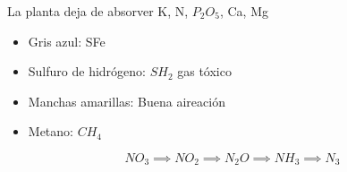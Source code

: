 La planta deja de absorver K, N, $P_2O_5$, Ca, Mg

\begin{itemize}
    \item Gris azul: SFe
    \item Sulfuro de hidrógeno: $SH_2$ gas tóxico
    \item Manchas amarillas: Buena aireación
    \item Metano: $CH_4$
\end{itemize}
\begin{equation}
    NO_3\implies NO_2\implies N_2O\implies NH_3\implies N_3
\end{equation}














